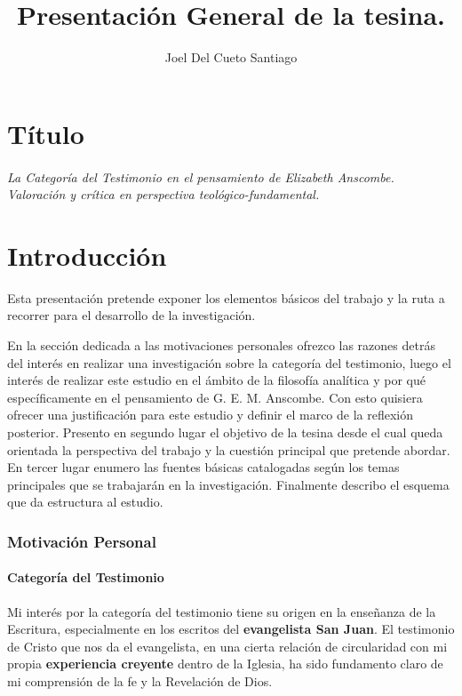 \documentclass[11pt]{article}
\title{Presentación General de la tesina.}
\author{Joel Del Cueto Santiago}
\begin{document}
\maketitle

\part*{Título}
\paragraph{\noindent La Categoría del Testimonio en el pensamiento de Elizabeth Anscombe.\\
\emph{Valoración y crítica en perspectiva teológico-fundamental.}}

\part*{Introducción}

Esta presentación pretende exponer los elementos básicos del trabajo y la ruta a recorrer para el desarrollo de la investigación.

En la sección dedicada a las motivaciones personales ofrezco las razones detrás del interés en realizar una investigación sobre la categoría del testimonio, luego el interés de realizar este estudio en el ámbito de la filosofía analítica y por qué específicamente en el pensamiento de G. E. M. Anscombe. Con esto quisiera ofrecer una justificación para este estudio y definir el marco de la reflexión posterior. Presento en segundo lugar el objetivo de la tesina desde el cual queda orientada la perspectiva del trabajo y la cuestión principal que pretende abordar. En tercer lugar enumero las fuentes básicas catalogadas según los temas principales que se trabajarán en la investigación. Finalmente describo el esquema que da estructura al estudio.

\section{Motivación Personal}

\subsection{Categoría del Testimonio}

Mi interés por la categoría del testimonio tiene su origen en la enseñanza de la Escritura, especialmente en los escritos del \textbf{evangelista San Juan}. El testimonio de Cristo que nos da el evangelista, en una cierta relación de circularidad con mi propia \textbf{experiencia creyente} dentro de la Iglesia, ha sido fundamento claro de mi comprensión de la fe y la Revelación de Dios.
\end{document}
